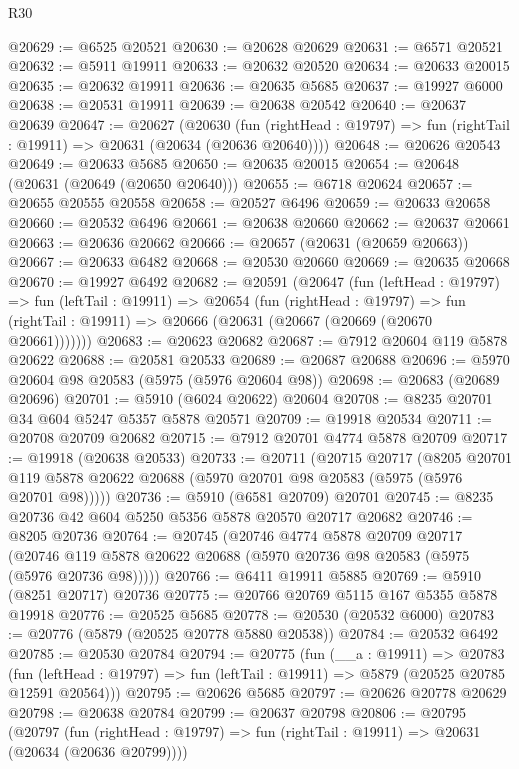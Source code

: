 \begin{lexlean}{R30}
\begin{coremodule}
@20629 := @6525 @20521
@20630 := @20628 @20629
@20631 := @6571 @20521
@20632 := @5911 @19911
@20633 := @20632 @20520
@20634 := @20633 @20015
@20635 := @20632 @19911
@20636 := @20635 @5685
@20637 := @19927 @6000
@20638 := @20531 @19911
@20639 := @20638 @20542
@20640 := @20637 @20639
@20647 := @20627
    (@20630
      (fun (rightHead : @19797) => fun (rightTail : @19911) => @20631 (@20634 (@20636 @20640))))
@20648 := @20626 @20543
@20649 := @20633 @5685
@20650 := @20635 @20015
@20654 := @20648 (@20631 (@20649 (@20650 @20640)))
@20655 := @6718 @20624
@20657 := @20655 @20555 @20558
@20658 := @20527 @6496
@20659 := @20633 @20658
@20660 := @20532 @6496
@20661 := @20638 @20660
@20662 := @20637 @20661
@20663 := @20636 @20662
@20666 := @20657 (@20631 (@20659 @20663))
@20667 := @20633 @6482
@20668 := @20530 @20660
@20669 := @20635 @20668
@20670 := @19927 @6492
@20682 := @20591
    (@20647
      (fun (leftHead : @19797) =>
      fun (leftTail : @19911) =>
      @20654
        (fun (rightHead : @19797) =>
        fun (rightTail : @19911) => @20666 (@20631 (@20667 (@20669 (@20670 @20661)))))))
@20683 := @20623 @20682
@20687 := @7912 @20604 @119 @5878 @20622
@20688 := @20581 @20533
@20689 := @20687 @20688
@20696 := @5970 @20604 @98 @20583 (@5975 (@5976 @20604 @98))
@20698 := @20683 (@20689 @20696)
@20701 := @5910 (@6024 @20622) @20604
@20708 := @8235 @20701 @34 @604 @5247 @5357 @5878 @20571
@20709 := @19918 @20534
@20711 := @20708 @20709 @20682
@20715 := @7912 @20701 @4774 @5878 @20709
@20717 := @19918 (@20638 @20533)
@20733 := @20711
    (@20715
      @20717
      (@8205 @20701 @119 @5878 @20622 @20688 (@5970 @20701 @98 @20583 (@5975 (@5976 @20701 @98)))))
@20736 := @5910 (@6581 @20709) @20701
@20745 := @8235 @20736 @42 @604 @5250 @5356 @5878 @20570 @20717 @20682
@20746 := @8205 @20736
@20764 := @20745
    (@20746
      @4774
      @5878
      @20709
      @20717
      (@20746 @119 @5878 @20622 @20688 (@5970 @20736 @98 @20583 (@5975 (@5976 @20736 @98)))))
@20766 := @6411 @19911 @5885
@20769 := @5910 (@8251 @20717) @20736
@20775 := @20766 @20769 @5115 @167 @5355 @5878 @19918
@20776 := @20525 @5685
@20778 := @20530 (@20532 @6000)
@20783 := @20776 (@5879 (@20525 @20778 @5880 @20538))
@20784 := @20532 @6492
@20785 := @20530 @20784
@20794 := @20775
    (fun (__a : @19911) =>
    @20783
      (fun (leftHead : @19797) => fun (leftTail : @19911) => @5879 (@20525 @20785 @12591 @20564)))
@20795 := @20626 @5685
@20797 := @20626 @20778 @20629
@20798 := @20638 @20784
@20799 := @20637 @20798
@20806 := @20795
    (@20797
      (fun (rightHead : @19797) => fun (rightTail : @19911) => @20631 (@20634 (@20636 @20799))))

\end{coremodule}
\end{lexlean}
